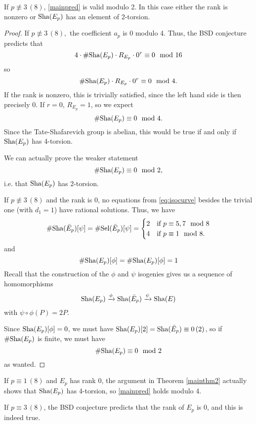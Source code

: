 \documentclass[12pt, a4paper]{report}
\begin{document}
\begin{thm} \label{mainthm2}
  If $p \not\equiv 3 \, (8)$, \autoref{mainpred} is valid modulo 2. In
  this case either the rank is nonzero or $\text{\normalfont Sha}(E_p)$ has an element of 2-torsion.
\end{thm}
\begin{proof}
  If $p \not\equiv 3 \, (8),$ the coefficient $a_p$ is 0 modulo 4.
  Thus,
  the BSD conjecture predicts that
  \[4 \cdot \#\text{\normalfont Sha}(E_p) \cdot R_{E_p} \cdot 0^r \equiv 0 \mod{16}\]
  so
  \[\# \text{\normalfont Sha}(E_p) \cdot R_{E_p} \cdot 0^r \equiv 0 \mod{4}.\]
  If the rank is nonzero, this is trivially satisfied, since the left hand side
  is then precisely 0. If $r = 0$, $R_{E_p} = 1$, so we expect
  \[\# \text{\normalfont Sha}(E_p) \equiv 0 \mod{4}.\]
  Since the Tate-Shafarevich group is abelian, this would be true 
  if and only if $\text{\normalfont Sha}(E_p)$ has 4-torsion. 

  We can actually prove the weaker statement
  \[\# \text{\normalfont Sha}(E_p) \equiv 0 \mod{2},\]
  i.e. that $\text{\normalfont Sha}(E_p)$ has 2-torsion.
  
  If $p \not\equiv 3 \, (8)$ and the rank is 0, no equations from
  \ref{eq:isocurve} besides the trivial one (with $d_1 = 1$) have rational
  solutions. Thus, we have
  \[\# \text{\normalfont Sha}(\bar{E}_p)[\psi] = \# \text{\normalfont Sel}(\bar{E}_p)[\psi] =
    \begin{cases}
      2 &\text{if } p \equiv 5,7 \mod{8} \\
      4 &\text{if } p \equiv 1 \mod{8}.
    \end{cases}
  \]
  and
  \[\# \text{\normalfont Sha}(E_p)[\phi] = \# \text{\normalfont Sha}(E_p)[\phi] = 1\]
  Recall that the construction of the $\phi$ and $\psi$ isogenies gives us a
  sequence of homomorphisms
  \[\text{\normalfont Sha}(E_p) \xrightarrow{\phi} \text{\normalfont Sha}(\bar{E}_p) \xrightarrow{\psi} \text{\normalfont Sha}(E)\]
  with $\psi \circ \phi (P) = 2P.$

  Since $\text{\normalfont Sha}(E_p)[\phi] = 0$, we must have $\text{\normalfont Sha}(E_p)[2] = \text{\normalfont Sha}(\bar{E}_p)
  \equiv 0 \, (2)$, so if $\# \text{\normalfont Sha}(E_p)$ is finite, we must have
  \[\# \text{\normalfont Sha}(E_p) \equiv 0 \mod{2}\]
  as wanted.

\end{proof}
\begin{remark}
  If $p \equiv 1 \, (8)$ and $E_p$ has rank 0,
  the argument in Theorem \autoref{mainthm2} actually shows that $\text{\normalfont Sha}(E_p)$ has
  4-torsion, so \autoref{mainpred} holds modulo 4.
\end{remark}

\begin{thm} \label{mainthm1}
  If $p \equiv 3 \, (8)$, the BSD conjecture predicts
  that the rank of $E_p$ is 0, and this is indeed true.
\end{thm}
\end{document}
